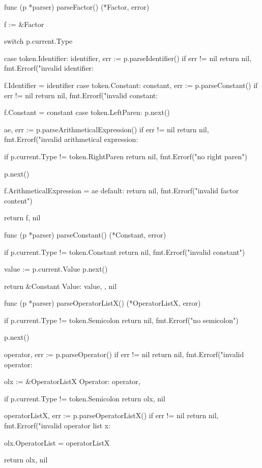 func (p *parser) parseFactor() (*Factor, error) {
	f := &Factor{}

	switch p.current.Type {
	case token.Identifier:
		identifier, err := p.parseIdentifier()
		if err != nil {
			return nil, fmt.Errorf("invalid identifier: %
		}

		f.Identifier = identifier
	case token.Constant:
		constant, err := p.parseConstant()
		if err != nil {
			return nil, fmt.Errorf("invalid constant: %
		}

		f.Constant = constant
	case token.LeftParen:
		p.next()

		ae, err := p.parseArithmeticalExpression()
		if err != nil {
			return nil, fmt.Errorf("invalid arithmetical expression: %
		}

		if p.current.Type != token.RightParen {
			return nil, fmt.Errorf("no right paren")
		}

		p.next()

		f.ArithmeticalExpression = ae
	default:
		return nil, fmt.Errorf("invalid factor content")
	}

	return f, nil
}

func (p *parser) parseConstant() (*Constant, error) {
	if p.current.Type != token.Constant {
		return nil, fmt.Errorf("invalid constant")
	}

	value := p.current.Value
	p.next()

	return &Constant{
		Value: value,
	}, nil
}

func (p *parser) parseOperatorListX() (*OperatorListX, error) {
	if p.current.Type != token.Semicolon {
		return nil, fmt.Errorf("no semicolon")
	}

	p.next()

	operator, err := p.parseOperator()
	if err != nil {
		return nil, fmt.Errorf("invalid operator: %
	}

	olx := &OperatorListX{
		Operator: operator,
	}

	if p.current.Type != token.Semicolon {
		return olx, nil
	}

	operatorListX, err := p.parseOperatorListX()
	if err != nil {
		return nil, fmt.Errorf("invalid operator list x: %
	}

	olx.OperatorList = operatorListX

	return olx, nil
}

